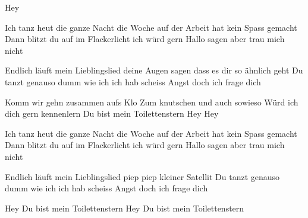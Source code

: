 \medskip

\begin{guitar}
  Hey 

  Ich tanz heut die ganze Nacht
  die Woche auf der Arbeit hat kein Spass gemacht
  Dann blitzt du auf im Flackerlicht
  ich würd gern Hallo sagen aber trau mich nicht

  Endlich läuft mein Lieblingslied
  deine Augen sagen dass es dir so ähnlich geht
  Du tanzt genauso dumm wie ich
  ich hab scheiss Angst doch ich frage dich 
  \smallskip

  Komm wir gehn zusammen aufs Klo 
  Zum knutschen und auch sowieso
  Würd ich dich gern kennenlern
  Du bist mein Toilettenstern 
  \smallskip
  Hey
  Hey
  \smallskip

  Ich tanz heut die ganze Nacht
  die Woche auf der Arbeit hat kein Spass gemacht
  Dann blitzt du auf im Flackerlicht
  ich würd gern Hallo sagen aber trau mich nicht

  Endlich läuft mein Lieblingslied
  piep piep kleiner Satellit
  Du tanzt genauso dumm wie ich
  ich hab scheiss Angst doch ich frage dich 

   

  Hey 
  Du bist mein Toilettenstern 
  Hey 
  Du bist mein Toilettenstern
\end{guitar}
